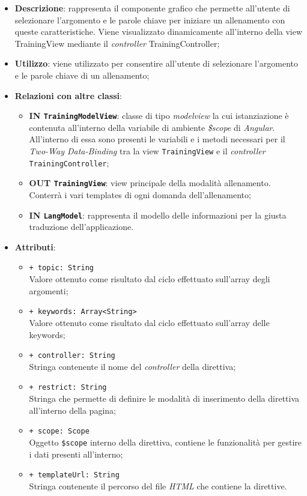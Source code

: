 		\begin{itemize}
			\item \textbf{Descrizione}: rappresenta il componente grafico che permette all'utente di selezionare l'argomento e le parole chiave per iniziare un allenamento con queste caratteristiche. Viene visualizzato dinamicamente all'interno della view TrainingView mediante il \textit{controller} TrainingController;
			\item \textbf{Utilizzo}: viene utilizzato per consentire all'utente di selezionare l'argomento e le parole chiave di un allenamento;
			\item \textbf{Relazioni con altre classi}: 
			\begin{itemize}
				\item \textbf{IN \texttt{TrainingModelView}}: classe di tipo \textit{modelview} la cui istanziazione è contenuta all'interno della variabile di ambiente \textit{\$scope} di \textit{Angular}. All'interno di essa sono presenti le variabili e i metodi necessari per il \textit{Two-Way Data-Binding} tra la view \texttt{TrainingView} e il \textit{controller} \texttt{TrainingController};
				\item \textbf{OUT \texttt{TrainingView}}: view principale della modalità allenamento. Conterrà i vari templates di ogni domanda dell'allenamento;  
				\item \textbf{IN \texttt{LangModel}}: rappresenta il modello delle informazioni per la giusta traduzione dell'applicazione.
			\end{itemize}
			\item \textbf{Attributi}:
			\begin{itemize}
				\item \texttt{+ topic: String} \\ Valore ottenuto come risultato dal ciclo effettuato sull'array degli argomenti;
				\item \texttt{+ keywords: Array<String>} \\ Valore ottenuto come risultato dal ciclo effettuato sull'array delle keywords;
				\item \texttt{+ controller: String} \\ Stringa contenente il nome del \textit{controller} della direttiva;
				\item \texttt{+ restrict: String} \\ Stringa che permette di definire le modalità di inserimento della direttiva all'interno della pagina;
				\item \texttt{+ scope: Scope} \\ Oggetto \texttt{\$scope} interno della direttiva, contiene le funzionalità per gestire i dati presenti all'interno;
				\item \texttt{+ templateUrl: String} \\ Stringa contenente il percorso del file \textit{HTML} che contiene la direttive.
			\end{itemize}
		\end{itemize}
		